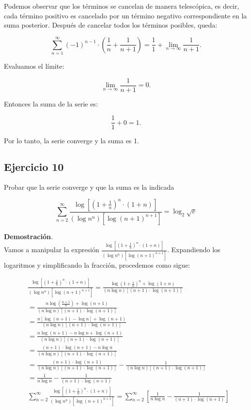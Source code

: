 \documentclass{article}
\begin{document}
    Podemos observar que los términos se cancelan de manera telescópica, es decir, cada término positivo es cancelado por un término negativo correspondiente en la suma posterior. Después de cancelar todos los términos posibles, queda:

    $$
    \sum_{n=1}^{\infty}(-1)^{n-1} \cdot\left(\frac{1}{n}+\frac{1}{n+1}\right) = \frac{1}{1} + \lim_{n \rightarrow \infty} \frac{1}{n+1}.
    $$

    Evaluamos el límite:

    $$
    \lim_{n \rightarrow \infty} \frac{1}{n+1} = 0.
    $$

    Entonces la suma de la serie es:

    $$
    \frac{1}{1} + 0 = 1.
    $$

    Por lo tanto, la serie converge y la suma es 1.

    \subsection*{Ejercicio 10}

    Probar que la serie converge y que la suma es la indicada

    $$
    \sum_{n=2}^{\infty} \frac{\log \left[\left(1+\frac{1}{n}\right)^{n} \cdot(1+n)\right]}{\left(\log n^{n}\right)\left[\log (n+1)^{n+1}\right]}=\log _{2} \sqrt{e}
    $$

    \textbf{Demostración}.\\

    Vamos a manipular la expresión $\frac{\log \left[\left(1+\frac{1}{n}\right)^{n} \cdot(1+n)\right]}{\left(\log n^{n}\right)\left[\log (n+1)^{n+1}\right]}$. Expandiendo los logaritmos y simplificando la fracción, procedemos como sigue:

    \begin{align*}
    & \frac{\log \left[\left(1+\frac{1}{n}\right)^{n} \cdot(1+n)\right]}{\left(\log n^{n}\right)\left[\log (n+1)^{n+1}\right]} = \frac{\log \left(1+\frac{1}{n}\right)^{n}+\log (1+n)}{(n \log n)[(n+1) \cdot \log (n+1)]} \\
    & =\frac{n \log \left(\frac{n+1}{n}\right)+\log (n+1)}{(n \log n)[(n+1) \cdot \log (n+1)]} \\
    & =\frac{n[\log (n+1)-\log n]+\log (n+1)}{(n \log n)[(n+1) \cdot \log (n+1)]} \\
    & =\frac{n \log (n+1)-n \log n+\log (n+1)}{(n \log n)[(n+1) \cdot \log (n+1)]} \\
    & =\frac{(n+1) \cdot \log (n+1)-n \log n}{(n \log n)[(n+1) \cdot \log (n+1)]} \\
    & =\frac{(n+1) \cdot \log (n+1)}{(n \log n)[(n+1) \cdot \log (n+1)]}-\frac{1}{(n \log n)[(n+1) \cdot \log (n+1)]} \\
    & =\frac{1}{n \log n}-\frac{1}{(n+1) \cdot \log (n+1)} \\
    & \sum_{n=2}^{\infty} \frac{\log \left[\left(1+\frac{1}{n}\right)^{n} \cdot(1+n)\right]}{\left(\log n^{n}\right)\left[\log (n+1)^{n+1}\right]} = \sum_{n=2}^{\infty}\left[\frac{1}{n \log n}-\frac{1}{(n+1) \cdot \log (n+1)}\right]
    \end{align*}
\end{document}
